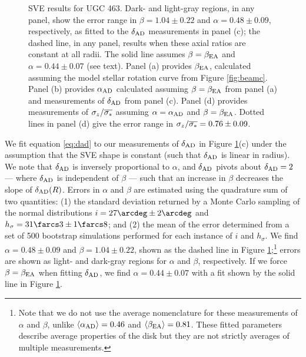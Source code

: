 \documentclass[apj,iop,numberedappendix]{emulateapj}
\begin{document}
\begin{figure}
\caption{
%
SVE results for UGC 463.  Dark- and light-gray regions, in any panel, show the
error range in $\beta = 1.04\pm0.22$ and $\alpha = 0.48\pm0.09$, respectively,
as fitted to the $\delta_{\rm AD}$ measurements in panel (c); the dashed line, in any
panel, results when these axial ratios are constant at all radii.  The solid
line assumes $\beta = \beta_{\rm EA}$ and $\alpha = 0.44\pm0.07$ (see text).
Panel (a) provides $\beta_{\rm EA}$, calculated assuming the model stellar
rotation curve from Figure \ref{fig:beamc}.  Panel (b) provides $\alpha_{\rm
AD}$ calculated assuming $\beta = \beta_{\rm EA}$ from panel (a) and
measurements of $\delta_{\rm AD}$ from panel (c).  Panel (d) provides measurements of
$\sigma_z/\overline{\sigma_{\ast}}$ assuming $\alpha=\alpha_{\rm AD}$ and $\beta=\beta_{\rm
EA}$.  Dotted lines in panel (d) give the error range in $\sigma_z/\overline{\sigma_{\ast}}
= 0.76\pm0.09$.
%
}
\label{fig:sve}
\end{figure}

We fit equation \ref{eq:dad} to our measurements of $\delta_{\rm AD}$ in Figure
\ref{fig:sve}(c) under the assumption that the SVE shape is constant (such that
$\delta_{\rm AD}$ is linear in radius).  We note that $\delta_{\rm AD}$ is inversely proportional to
$\alpha$, and $\delta_{\rm AD}$ pivots about $\delta_{\rm AD} = 2$ --- where $\delta_{\rm AD}$ is independent of
$\beta$ --- such that an increase in $\beta$ decreases the slope of $\delta_{\rm AD}(R)$.
Errors in $\alpha$ and $\beta$ are estimated using the quadrature sum of two
quantities: (1) the standard deviation returned by a Monte Carlo sampling of the
normal distributions $i=27\arcdeg\pm2\arcdeg$ and $h_{\sigma} =
31\farcs3\pm1\farcs8$; and (2) the mean of the error determined from a set of
500 bootstrap simulations performed for each instance of $i$ and $h_{\sigma}$.
We find $\alpha = 0.48\pm0.09$ and $\beta = 1.04\pm0.22$, shown as the dashed
line in Figure \ref{fig:sve};\footnote{
%
Note that we do not use the average nomenclature for these measurements of
$\alpha$ and $\beta$, unlike $\langle \alpha_{\rm AD} \rangle=0.46$ and
$\langle \beta_{\rm EA} \rangle = 0.81$.  These fitted parameters describe average
properties of the disk but they are not strictly averages of multiple
measurements.
%
} errors are shown as light- and dark-gray regions for $\alpha$ and $\beta$,
respectively.  If we force $\beta = \beta_{\rm EA}$ when fitting $\delta_{\rm AD}$, we find
$\alpha = 0.44\pm0.07$ with a fit shown by the solid line in Figure
\ref{fig:sve}.
\end{document}
